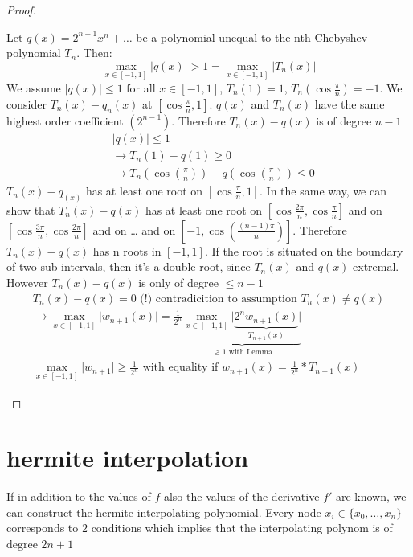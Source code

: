 \begin{proof}
    \begin{lemma}
        Let $q(x)=2^{n-1}x^n+\ldots$  be a polynomial unequal to the nth Chebyshev polynomial $T_n$.
        Then:
        \begin{equation*}
            \max_{x \in [-1,1]} \lvert q(x) \rvert > 1= \max_{x \in [-1,1]} \lvert T_n(x) \rvert
        \end{equation*}
        We assume $\lvert q(x) \rvert \leq 1$ for all $x \in [-1,1]$, $T_n(1) = 1$, $T_n\left( \cos \frac{\pi}{n} \right) = -1$.
        We consider $T_n(x)-q_n(x)$ at $[\cos \frac{\pi}{n}, 1]$.
        $q(x)$ and $T_n(x)$ have the same highest order coefficient $(2^{n-1})$.
        Therefore $T_n(x)-q(x)$ is of degree $n-1$
        \begin{align*}
            &\lvert q(x) \rvert \leq 1\\
            &\to T_n(1)-q(1) \geq 0\\
            &\to T_n\left(\cos \left( \frac{\pi}{n} \right) \right) - q\left(\cos \left( \frac{\pi}{n} \right) \right) \leq 0
        \end{align*}
        $T_n(x)-q_(x)$ has at least one root on $[\cos\frac{\pi}{n}, 1]$.
        In the same way, we can show that $T_n(x)-q(x)$ has at least one root on $[\cos\frac{2\pi}{n},\cos\frac{\pi}{n}]$
        and on $[\cos\frac{3\pi}{n},\cos\frac{2\pi}{n}]$ and on \ldots{} and on $[-1, \cos \left( \frac{(n-1)  \pi}{n} \right)]$.
        Therefore $T_n(x)-q(x)$ has n roots in $[-1,1]$.
        If the root is situated on the boundary of two sub intervals, then it's a double root, since $T_n(x)$ and $q(x)$ extremal.
        However $T_n(x) - q(x)$ is only of degree $\leq n-1$
        \begin{align*}
            T_n(x)-q(x) = 0 \text{ (!) contradicition to assumption } T_n(x) \neq q(x) \\
            \to \max_{x \in [-1,1]} \lvert w_{n+1}(x) \rvert = \frac{1}{2^n}
            \underbrace{\max_{x \in [-1,1]} \lvert \underbrace{2^n w_{n+1}(x)}_{T_{n+1}(x)} \rvert}_{ \geq 1 \text{ with Lemma}}\\
            \max_{x \in [-1,1]} \lvert w_{n+1}  \rvert \geq \frac{1}{2^n} \text{ with equality if } w_{n+1}(x) = \frac{1}{2^n}*T_{n+1}(x)
        \end{align*}
    \end{lemma}
\end{proof}


\section{hermite interpolation}\label{sec:hermite-interpolation}
If in addition to the values of $f$ also the values of the derivative $f'$ are known, we can construct the hermite interpolating polynomial.
Every node $x_i \in \{ x_0, \ldots, x_n \}$ corresponds to $2$ conditions which implies that the interpolating polynom is of degree $2n+1$

